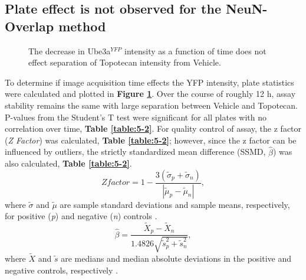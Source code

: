 \subsection{Plate effect is not observed for the \textbf{NeuN-Overlap} method}

\begin{figure}[!h]
  \centering
  \caption{The decrease in Ube3a$^{YFP}$ intensity as a function of time does not effect separation of Topotecan intensity from Vehicle.}
  \label{Figure 5-2: }
\end{figure}
To determine if image acquisition time effects the YFP intensity, plate statistics were calculated and plotted in \textbf{Figure \ref{Figure 5-2: }}. Over the course of roughly 12 h, assay stability remains the same with large separation between Vehicle and Topotecan. P-values from the Student's T test were significant for all plates with no correlation over time, \textbf{Table \ref{table:5-2}}. For quality control of assay, the z factor (\textit{Z Factor}) was calculated, \textbf{Table \ref{table:5-2}}; however, since the z factor can be influenced by outliers, the strictly standardized mean difference (SSMD, $\hat{\beta}$) was also calculated, \textbf{Table \ref{table:5-2}}.
\[ Z factor = 1 - \frac{3(\tilde{\sigma}_p + \tilde{\sigma}_n)}{| \tilde{\mu}_p - \tilde{\mu}_n |}, \]
where \( \tilde{\sigma} \) and \( \tilde{\mu} \) are sample standard deviations and sample means, respectively, for positive (\textit{p}) and negative (\textit{n}) controls \cite{Zhang1999,Zhang2011}.
\[ \hat{\beta} = \frac{\tilde{X}_p - \tilde{X}_n}{1.4826\sqrt{\tilde{s}^{2}_p + \tilde{s}^2_n}}, \]
where \( \tilde{X} \) and \( \tilde{s} \) are medians and median absolute deviations in the positive and negative controls, respectively \cite{Zhang2011,Zhang2011b}.

